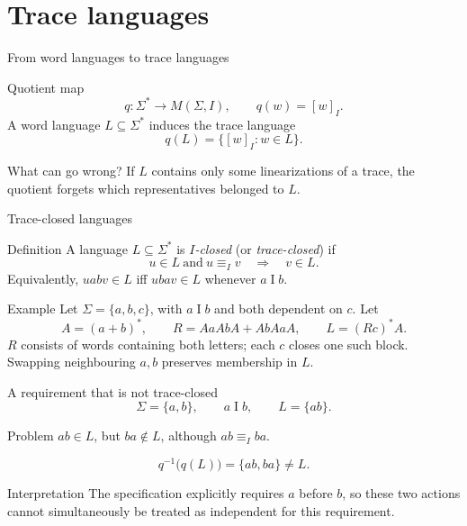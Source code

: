 \documentclass[t,11pt]{beamer}
\newcommand{\ind}{\mathrel{I}}
\begin{document}
\section{Trace languages}

\begin{frame}{From word languages to trace languages}
  \begin{block}{Quotient map}
    \[
       q:\Sigma^*\longrightarrow M(\Sigma,I),\qquad q(w)=[w]_I.
    \]
    A word language $L\subseteq\Sigma^*$ induces the trace language
    \[
       q(L)=\{[w]_I:w\in L\}.
    \]
  \end{block}
  \begin{block}{What can go wrong?}
    If $L$ contains only some linearizations of a trace, the quotient forgets which representatives belonged to $L$.
  \end{block}
\end{frame}

\begin{frame}{Trace-closed languages}
  \begin{block}{Definition}
    A language $L\subseteq\Sigma^*$ is \emph{$I$-closed} (or \emph{trace-closed}) if
    \[
      u\in L\ \text{and}\ u\equiv_Iv
      \quad\Longrightarrow\quad v\in L.
    \]
    Equivalently, $uabv\in L$ iff $ubav\in L$ whenever $a\ind b$.
  \end{block}
  \begin{block}{Example}
    Let $\Sigma=\{a,b,c\}$, with $a\ind b$ and both dependent on $c$. Let
    \[
      A=(a+b)^*,\qquad R=AaAbA+AbAaA,\qquad L=(Rc)^*A.
    \]
    $R$ consists of words containing both letters; each $c$ closes one such block. Swapping neighbouring $a,b$ preserves membership in $L$.
  \end{block}
\end{frame}

\begin{frame}{A requirement that is not trace-closed}
  \[
     \Sigma=\{a,b\},\qquad a\ind b,\qquad L=\{ab\}.
  \]
  \begin{block}{Problem}
    $ab\in L$, but $ba\notin L$, although $ab\equiv_Iba$.
  \end{block}
  \[
    q^{-1}\bigl(q(L)\bigr)=\{ab,ba\}\neq L.
  \]
  \begin{block}{Interpretation}
    The specification explicitly requires $a$ before $b$, so these two actions cannot simultaneously be treated as independent for this requirement.
  \end{block}
\end{frame}
\end{document}
